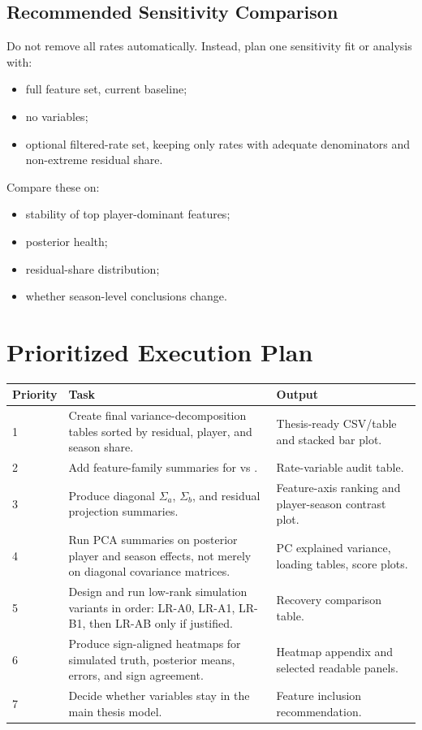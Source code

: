 \documentclass[11pt]{article}
\newcommand{\code}[1]{\texttt{\detokenize{#1}}}
\begin{document}
\subsection{Recommended Sensitivity Comparison}

Do not remove all rates automatically. Instead, plan one sensitivity fit or
analysis with:

\begin{itemize}[leftmargin=*]
  \item full feature set, current baseline;
  \item no \code{rate_*} variables;
  \item optional filtered-rate set, keeping only rates with adequate
  denominators and non-extreme residual share.
\end{itemize}

Compare these on:

\begin{itemize}[leftmargin=*]
  \item stability of top player-dominant \code{per90_*} features;
  \item posterior health;
  \item residual-share distribution;
  \item whether season-level conclusions change.
\end{itemize}

\section{Prioritized Execution Plan}

\begin{longtable}{L{0.12\textwidth}L{0.54\textwidth}L{0.24\textwidth}}
\toprule
Priority & Task & Output \\
\midrule
{} & Create final variance-decomposition tables sorted by residual, player, and
season share. & Thesis-ready CSV/table and stacked bar plot. \\
2 & Add feature-family summaries for \code{per90_*} vs \code{rate_*}. &
Rate-variable audit table. \\
3 & Produce diagonal \(\Sigma_a\), \(\Sigma_b\), and residual projection
summaries. & Feature-axis ranking and player-season contrast plot. \\
4 & Run PCA summaries on posterior player and season effects, not merely on
diagonal covariance matrices. & PC explained variance, loading tables, score
plots. \\
5 & Design and run low-rank simulation variants in order: LR-A0, LR-A1, LR-B1,
then LR-AB only if justified. & Recovery comparison table. \\
6 & Produce sign-aligned heatmaps for simulated truth, posterior means, errors,
and sign agreement. & Heatmap appendix and selected readable panels. \\
7 & Decide whether \code{rate_*} variables stay in the main thesis model. &
Feature inclusion recommendation. \\
\bottomrule
\end{longtable}
\end{document}
